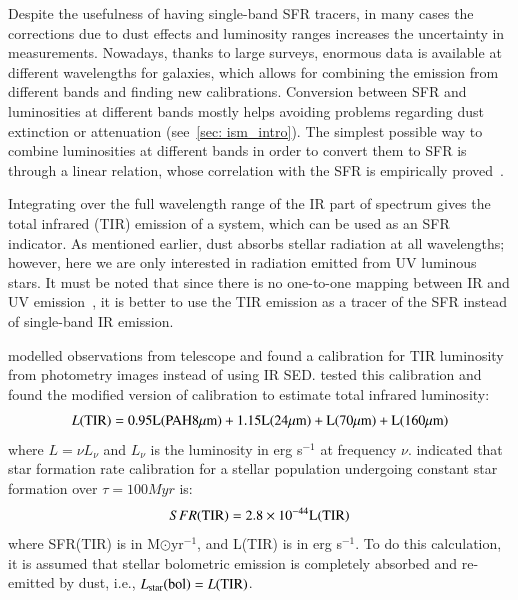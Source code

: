 Despite the usefulness of having single-band SFR tracers, in many cases the corrections due to dust effects and luminosity ranges increases the uncertainty in measurements.
Nowadays, thanks to large surveys, enormous data is available at different wavelengths for galaxies, which allows for combining the emission from different bands and finding new calibrations.
Conversion between SFR and luminosities at different bands mostly helps avoiding problems regarding dust extinction or attenuation (see~\ref{sec: ism_intro}). 
The simplest possible way to combine luminosities at different bands in order to convert them to SFR is through a linear relation, whose correlation with the SFR is empirically proved~\citep{Kennicutt12}. 

Integrating over the full wavelength range of the IR part of spectrum gives the total infrared (TIR) emission of a system, which can be used as an SFR indicator. 
As mentioned earlier, dust absorbs stellar radiation at all wavelengths; however, here we are only interested in radiation emitted from UV luminous stars. 
It must be noted that since there is no one-to-one mapping between IR and UV emission~\citep{Calzetti13}, it is better to use the TIR emission as a tracer of the SFR instead of single-band IR emission.
 
\cite{Draine07} modelled observations from \Spitzer telescope and found a calibration for TIR luminosity from photometry images instead of using IR SED. 
\cite{Boquien10} tested this calibration and found the modified version of calibration to estimate total infrared luminosity: 
\begin{equation}
L(\rm TIR) = 0.95L(PAH 8 \mu m) + 1.15L(24 \mu m) + L(70 \mu m) + L(160 \mu m)
\end{equation}
where $L = \nu L_{\nu}$ and $L_{\nu}$ is the luminosity  in erg s$^{-1}$ at frequency $\nu$. 
\cite{Calzetti07} indicated that star formation rate calibration for a stellar population undergoing constant star formation over $\tau=100Myr$ is:
\begin{equation}
\label{sfr_tot_IR}
SFR(\rm TIR) = 2.8 \times10^{-44}L(\rm TIR)
\end{equation}
where SFR(TIR) is in M${\odot}$yr$^{-1}$, and L(TIR) is in erg s$^{-1}$. 
To do this calculation, it is assumed that stellar bolometric emission is completely absorbed and re-emitted by dust, i.e., $L_{\mathrm{star}}({\rm bol})=L(\rm TIR)$.

